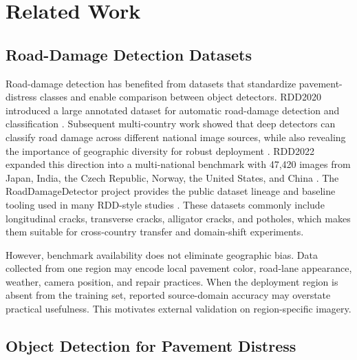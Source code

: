 \documentclass[applsci,article,submit,moreauthors]{Definitions/mdpi}
\begin{document}
\section{Related Work}

\subsection{Road-Damage Detection Datasets}

Road-damage detection has benefited from datasets that standardize pavement-distress classes and enable comparison between object detectors. RDD2020 introduced a large annotated dataset for automatic road-damage detection and classification \cite{arya2021rdd2020}. Subsequent multi-country work showed that deep detectors can classify road damage across different national image sources, while also revealing the importance of geographic diversity for robust deployment \cite{arya2021multiple}. RDD2022 expanded this direction into a multi-national benchmark with 47,420 images from Japan, India, the Czech Republic, Norway, the United States, and China \cite{arya2024rdd2022}. The RoadDamageDetector project provides the public dataset lineage and baseline tooling used in many RDD-style studies \cite{sekilab2026road}. These datasets commonly include longitudinal cracks, transverse cracks, alligator cracks, and potholes, which makes them suitable for cross-country transfer and domain-shift experiments.

However, benchmark availability does not eliminate geographic bias. Data collected from one region may encode local pavement color, road-lane appearance, weather, camera position, and repair practices. When the deployment region is absent from the training set, reported source-domain accuracy may overstate practical usefulness. This motivates external validation on region-specific imagery.

\subsection{Object Detection for Pavement Distress}
\end{document}

